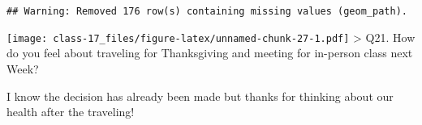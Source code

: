 \documentclass[
]{article}
\begin{document}
\begin{verbatim}
## Warning: Removed 176 row(s) containing missing values (geom_path).
\end{verbatim}

\texttt{[image: class-17\_files/figure-latex/unnamed-chunk-27-1.pdf]}
\textgreater{} Q21. How do you feel about traveling for Thanksgiving and
meeting for in-person class next Week?

I know the decision has already been made but thanks for thinking about
our health after the traveling!
\end{document}
